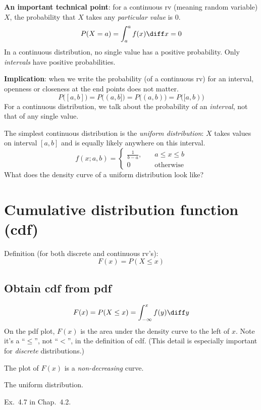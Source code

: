 \documentclass[12pt]{article}
\begin{document}
\textbf{An important technical point}:
for a continuous rv (meaning random variable) $X$,
the probability that $X$ takes any
\emph{particular value} is 0.
\[
P(X = a) = \int_a^a f(x) \diff x = 0
\]
In a continuous distribution,
no single value has a positive probability.
Only \emph{intervals} have positive probabilities.

\textbf{Implication}:
when we write the probability (of a continuous rv) for an interval,
openness or closeness at the end points does not matter.
\[
P\bigl([a,b]\bigr) = P\bigl((a, b]\bigr) = P\bigl((a,b)\bigr) = P\bigl([a,b)\bigr)
\]
For a continuous distribution,
we talk about the probability of an \emph{interval}, not that of any single
value.

\example
The simplest continuous distribution is the
\emph{uniform distribution}: $X$ takes values on interval $[a,b]$
and is equally likely anywhere on this interval.
\[
f(x; a, b) =
\begin{cases}
    \frac{1}{b-a},\quad & a \le x \le b\\
    0                   & \text{otherwise}
\end{cases}
\]
What does the density curve of a uniform distribution look like?



\section{Cumulative distribution function (cdf)}

Definition (for both discrete and continuous rv's):
\[
F(x) = P(X \le x)
\]


\subsection{Obtain cdf from pdf}

\[
F(x) = P(X \le x) = \int_{-\infty}^x f(y) \diff y
\]
On the pdf plot, $F(x)$ is the area under the density curve to the left
of $x$.
Note it's a ``$\le$'', not ``$<$'', in the definition of cdf.
(This detail is especially important for \emph{discrete} distributions.)

The plot of $F(x)$ is a \emph{non-decreasing} curve.


\example The uniform distribution.

\example Ex.~4.7 in Chap.~4.2.
\end{document}
